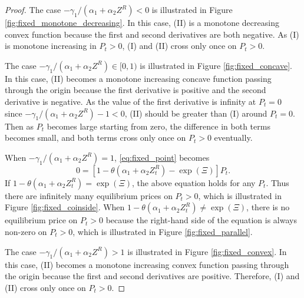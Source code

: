 \documentclass[11pt, a4paper]{article}
\theoremstyle{remark}
\begin{document}
\begin{proof}
The case $-\gamma_1/(\alpha_1+\alpha_2 Z^R) < 0$ is illustrated in Figure \ref{fig:fixed_monotone_decreasing}. In this case, (II) is a monotone decreasing convex function because the first and second derivatives are both negative. As (I) is monotone increasing in $P_t >0$, (I) and (II) cross only once on $P_t >0$.

The case $-\gamma_1/(\alpha_1+\alpha_2 Z^R) \in [0, 1)$ is illustrated in Figure \ref{fig:fixed_concave}. In this case, (II) becomes a monotone increasing concave function passing through the origin because the first derivative is positive and the second derivative is negative.
As the value of the first derivative is infinity at $P_t = 0$ since $-\gamma_1/(\alpha_1+\alpha_2 Z^R)-1<0$, (II) should be greater than (I) around $P_t = 0$. Then as $P_t$ becomes large starting from zero, the difference in both terms becomes small, and both terms cross only once on $P_t >0$ eventually.

When $-\gamma_1/(\alpha_1+\alpha_2 Z^R) = 1$, \eqref{eq:fixed_point} becomes
\[ 0 = [1 - \theta (\alpha_1 + \alpha_2 Z^{R}_{t}) - \exp(\Xi)] P_t. \]
If $ 1 - \theta (\alpha_1 + \alpha_2 Z^{R}_{t}) = \exp(\Xi)$, the above equation holds for any $P_t$. 
Thus there are infinitely many equilibrium prices on $P_t >0$, which is illustrated in Figure \ref{fig:fixed_coinside}.
When $ 1 - \theta (\alpha_1 + \alpha_2 Z^{R}_{t}) \ne \exp(\Xi)$, there is no equilibrium price on $P_t >0$ because the right-hand side of the equation is always non-zero on $P_t >0$, which is illustrated in Figure \ref{fig:fixed_parallel}.

The case $-\gamma_1/(\alpha_1+\alpha_2 Z^R) > 1$ is illustrated in Figure \ref{fig:fixed_convex}. In this case, (II) becomes a monotone increasing convex function passing through the origin because the first and second derivatives are positive. Therefore, (I) and (II) cross only once on $P_t >0$.




\end{proof}
\end{document}

